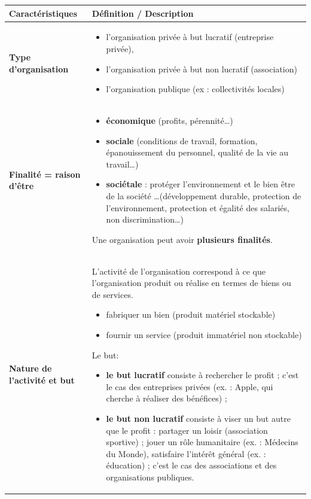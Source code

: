 \documentclass[stage1a]{tnreport} %
\begin{document}
\begin{table}
\centering
\begin{tabular}{|p{4cm}|p{13cm}|}
\hline
\textbf{Caractéristiques} & \textbf{Définition / Description} \\
\hline

\textbf{Type d’organisation} &
\begin{itemize}
 \item l’organisation privée à but lucratif (entreprise privée),
 \item l’organisation privée à but non lucratif (association)
 \item l’organisation publique (ex : collectivités locales)
\end{itemize} \\
\hline

\textbf{Finalité = raison d’être} &
\begin{itemize}
 \item \textbf{économique} (profits, pérennité\ldots)
 \item \textbf{sociale} (conditions de travail, formation, épanouissement du personnel, qualité de la vie au travail\ldots)
 \item \textbf{sociétale} : protéger l’environnement et le bien être de la société \ldots (développement durable, protection de l’environnement, protection et égalité des salariés, non discrimination\ldots)
\end{itemize}

Une organisation peut avoir \textbf{plusieurs finalités}. \\
\hline

\textbf{Nature de l’activité et but} &
L’activité de l’organisation correspond à ce que l’organisation produit ou réalise en termes de biens ou de services.
\begin{itemize}
 \item fabriquer un bien (produit matériel stockable)
 \item fournir un service (produit immatériel non stockable)
\end{itemize}

Le but:
\begin{itemize}
 \item \textbf{le but lucratif} consiste à rechercher le profit ; c’est le cas des entreprises privées 
(ex. : Apple, qui cherche à réaliser des bénéfices) ; 
 \item \textbf{le but non lucratif} consiste à viser un but autre que le profit : partager un loisir (association sportive) ; jouer un rôle humanitaire (ex. : Médecins du Monde), satisfaire l’intérêt général (ex. : éducation) ; c’est le cas des associations et des organisations publiques.
\end{itemize} \\
\hline


\end{tabular}
\end{table}
\end{document}
